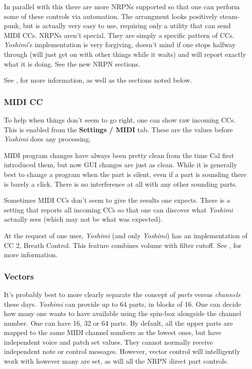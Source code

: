 \documentclass[
 11pt,
 twoside,
 a4paper,
 final                                 %
]{article}
\begin{document}
   In parallel with this there are more NRPNs supported so that one can perform
   some of these controls via automation. The arrangment looks positively
   steam-punk, but is actually very easy to use, requiring only a utility that
   can send MIDI CCs.  NRPNs aren't special. They are simply a specific pattern
   of CCs.  \textsl{Yoshimi}'s implementation is very forgiving, doesn't mind
   if one stops halfway through (will just get on with other things while it
   waits) and will report exactly what it is doing.  See the new NRPN
   sections.

   See , for more information, as well as the sections
   noted below.

\subsubsection{MIDI CC}
\label{subsubsec:new_features_midi_cc}

   To help when things don't seem to go right, one can show raw incoming
   CCs. This is enabled from the \textbf{Settings / MIDI} tab.
   These are the values before \textsl{Yoshimi} does any processing.

   MIDI program changes have always been pretty clean from the time Cal first
   introduced them, but now GUI changes are just as clean. While it is
   generally best to change a program when the part is silent, even if a part
   is sounding there is barely a click. There is no interference at all
   with any other sounding parts.

   Sometimes MIDI CCs don't seem to give the results one expects. There is
   a setting that reports all incoming CCs so that one can discover
   what \textsl{Yoshimi} actually sees (which may not be what was expected).

   At the request of one user, \textsl{Yoshimi} (and only \textsl{Yoshimi})
   has an implementation of CC 2, Breath Control.
   This feature combines volume with filter cutoff.
   See , for more information.

\subsubsection{Vectors}
\label{subsubsec:new_features_vectors}

   It's probably best to more clearly separate the concept of
   \textsl{parts} versus \textsl{channels} these days. 
   \textsl{Yoshimi} can provide up to 64 parts, in blocks of 16. One can
   decide how many one wants to have available using the spin-box alongside
   the channel number.  One can have 16, 32 or 64 parts.  By default, all the
   upper parts are mapped to the same MIDI channel numbers as the lowest ones,
   but have independent voice and patch set values. They cannot normally
   receive independent note or control messages. However, vector control will
   intelligently work with however many are set, as will all the NRPN direct
   part controls.
\end{document}

